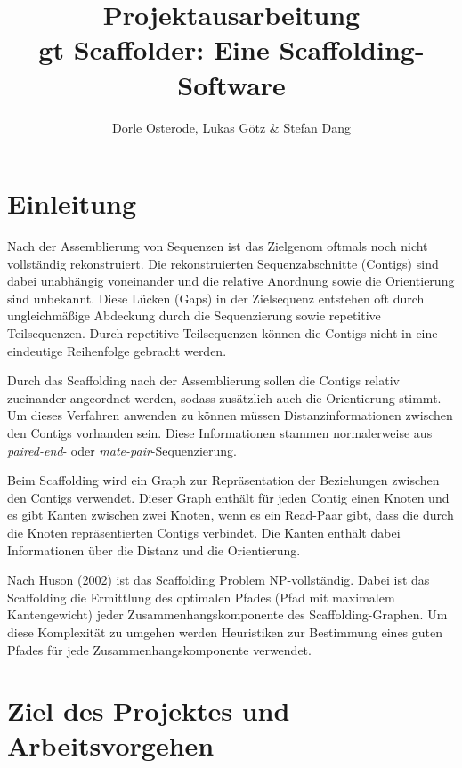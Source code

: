 \documentclass[a4paper,10pt,parskip]{scrartcl}
\title{Projektausarbeitung \\\vspace{.5cm} \large gt Scaffolder: Eine Scaffolding-Software}
\author{Dorle Osterode, Lukas Götz \& Stefan Dang}
\date{}
\begin{document}
\maketitle{}
\thispagestyle{empty}
\begin{abstract}
\end{abstract}

\newpage{}
\setcounter{page}{1}
\section{Einleitung}

Nach der Assemblierung von Sequenzen ist das Zielgenom oftmals noch
nicht vollständig rekonstruiert. Die rekonstruierten Sequenzabschnitte
(Contigs) sind dabei unabhängig voneinander und die relative Anordnung
sowie die Orientierung sind unbekannt. Diese Lücken (Gaps) in der
Zielsequenz entstehen oft durch ungleichmäßige Abdeckung durch die
Sequenzierung sowie repetitive Teilsequenzen. Durch repetitive
Teilsequenzen können die Contigs nicht in eine eindeutige Reihenfolge
gebracht werden.

Durch das Scaffolding nach der Assemblierung sollen die Contigs
relativ zueinander angeordnet werden, sodass zusätzlich auch die
Orientierung stimmt. Um dieses Verfahren anwenden zu können müssen
Distanzinformationen zwischen den Contigs vorhanden sein. Diese
Informationen stammen normalerweise aus \textit{paired-end}- oder
\textit{mate-pair}-Sequenzierung.

Beim Scaffolding wird ein Graph zur Repräsentation der Beziehungen
zwischen den Contigs verwendet. Dieser Graph enthält für jeden Contig
einen Knoten und es gibt Kanten zwischen zwei Knoten, wenn es ein
Read-Paar gibt, dass die durch die Knoten repräsentierten Contigs
verbindet. Die Kanten enthält dabei Informationen über die Distanz und
die Orientierung.

Nach Huson (2002) \cite{Huson:2002kf} ist das Scaffolding Problem
NP-vollständig. Dabei ist das Scaffolding die Ermittlung des optimalen
Pfades (Pfad mit maximalem Kantengewicht) jeder
Zusammenhangskomponente des Scaffolding-Graphen. Um diese Komplexität
zu umgehen werden Heuristiken zur Bestimmung eines guten Pfades für
jede Zusammenhangskomponente verwendet.

\section{Ziel des Projektes und Arbeitsvorgehen}
\end{document}
